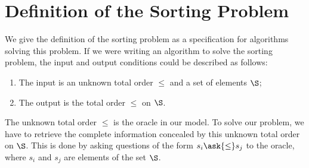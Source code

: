 \section{Definition of the Sorting Problem}
\label{tree:sorting:def}

We give the definition of the sorting problem as a specification for algorithms
solving this problem.
If we were writing an algorithm to solve the sorting problem, the input and output
conditions could be described as follows:

\begin{enumerate}
\item The input is an unknown total order \(\le\) and a set of elements \(\S\);
\item The output is the total order \(\le\) on \(\S\).
\end{enumerate}

The unknown total order \(\le\) is the oracle in our model. To solve our
problem, we have to retrieve the complete information concealed by this
unknown total order on \(\S\). This is done by asking questions of the
form \(s_i \ask{\le} s_j\) to the oracle, where \(s_i\) and \(s_j\) are
elements of the set \(\S\).

